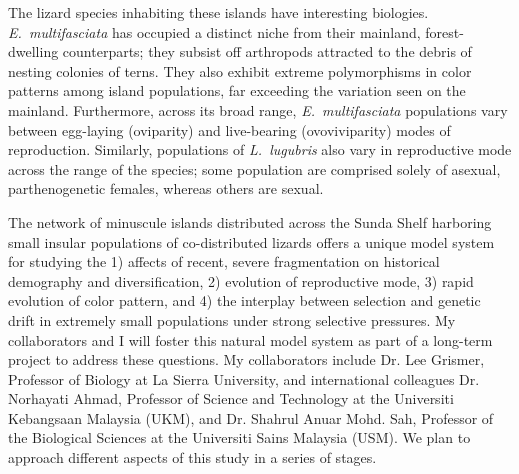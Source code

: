 \documentclass[10pt]{article}
\begin{document}
The lizard species inhabiting these islands have interesting biologies.
\emph{E.\ multifasciata} has occupied a distinct niche from their mainland, forest-dwelling counterparts; they subsist off arthropods attracted to the debris of nesting colonies of terns.
They also exhibit extreme polymorphisms in color patterns among island populations, far exceeding the variation seen on the mainland.
Furthermore, across its broad range, \emph{E.\ multifasciata} populations vary between egg-laying (oviparity) and live-bearing (ovoviviparity) modes of reproduction.
Similarly, populations of \emph{L.\ lugubris} also vary in reproductive mode across the range of the species; some population are comprised solely of asexual, parthenogenetic females, whereas others are sexual.

The network of minuscule islands distributed across the Sunda Shelf harboring small insular populations of co-distributed lizards offers a unique model system for studying the 
1) affects of recent, severe fragmentation on historical demography and diversification,
2) evolution of reproductive mode,
3) rapid evolution of color pattern, and 
4) the interplay between selection and genetic drift in extremely small populations under strong selective pressures.
My collaborators and I will foster this natural model system as part of a long-term project to address these questions.
My collaborators include
Dr. Lee Grismer, Professor of Biology at La Sierra University, and international colleagues
Dr. Norhayati Ahmad, Professor of Science and Technology at the Universiti Kebangsaan Malaysia (UKM), and
Dr. Shahrul Anuar Mohd. Sah, Professor of the Biological Sciences at the Universiti Sains Malaysia (USM).
We plan to approach different aspects of this study in a series of stages.
\end{document}

